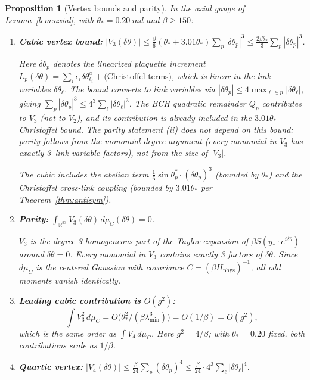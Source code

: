 \documentclass[11pt]{article}
\newtheorem{proposition}[theorem]{Proposition}
\theoremstyle{definition}
\newcommand{\R}{\mathbb{R}}
\begin{document}
\begin{proposition}[Vertex bounds and parity]\label{prop:vertex}
In the axial gauge of Lemma~\ref{lem:axial}, with $\theta_*=0.20$\,rad
and $\beta\ge 150$:
\begin{enumerate}[nosep,label=(\roman*)]
\item \textbf{Cubic vertex bound:}
$|V_3(\delta\theta)|
\le\frac{\beta}{6}(\theta_*+3.01\theta_*)\sum_p|\delta\theta_p|^3
\le\frac{2\beta\theta_*}{3}\sum_p|\delta\theta_p|^3$.

Here $\delta\theta_p$ denotes the \emph{linearized plaquette
increment} $L_p(\delta\theta)=\sum_i\epsilon_i\delta\theta_{\ell_i}^a
+\text{(Christoffel terms)}$, which is \emph{linear} in the
link variables $\delta\theta_\ell$.  The bound converts to link
variables via $|\delta\theta_p|\le 4\max_{\ell\in p}
|\delta\theta_\ell|$, giving
$\sum_p|\delta\theta_p|^3\le 4^3\sum_\ell|\delta\theta_\ell|^3$.
The BCH quadratic remainder $Q_p$ contributes to $V_3$ (not to
$V_2$), and its contribution is already included in the
$3.01\theta_*$ Christoffel bound.
\emph{The parity statement (ii) does not depend on this bound}:
parity follows from the monomial-degree argument (every monomial
in $V_3$ has exactly 3~link-variable factors), not from the
size of $|V_3|$.

The cubic includes the abelian term
$\frac{1}{6}\sin\theta_p^*\cdot(\delta\theta_p)^3$ (bounded by
$\theta_*$) and the Christoffel cross-link coupling
(bounded by $3.01\theta_*$ per Theorem~\ref{thm:antisym}).

\item \textbf{Parity:}
$\int_{\R^{93}} V_3(\delta\theta)\,d\mu_C(\delta\theta) = 0$.

$V_3$ is the degree-3 homogeneous part of the Taylor expansion
of $\beta S(y_*\cdot e^{i\delta\theta})$ around $\delta\theta=0$.
Every monomial in $V_3$ contains \emph{exactly 3} factors of
$\delta\theta$.  Since $d\mu_C$ is the centered Gaussian with
covariance $C=(\beta H_{\mathrm{phys}})^{-1}$, all odd moments
vanish identically.

\item \textbf{Leading cubic contribution is $O(g^2)$:}
\begin{equation}\label{eq:V3sq}
\int V_3^2\,d\mu_C=O\bigl(\theta_*^2/(\beta\lambda_{\min}^3)\bigr)
=O(1/\beta)=O(g^2),
\end{equation}
which is the same order as $\int V_4\,d\mu_C$.  Here $g^2=4/\beta$;
with $\theta_*=0.20$ fixed, both contributions scale as $1/\beta$.

\item \textbf{Quartic vertex:}
$|V_4(\delta\theta)|
\le\frac{\beta}{24}\sum_p(\delta\theta_p)^4
\le\frac{\beta}{24}\cdot 4^3\sum_\ell|\delta\theta_\ell|^4$.
\end{enumerate}
\end{proposition}
\end{document}
